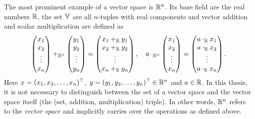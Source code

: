 The most prominent example of a vector space is \( \mathbb{R}^n \).
Its base field are the real numbers \( \mathbb{R} \), the set \( \mathbb{V} \) are all \( n \)-tuples with real components and vector addition and scalar multiplication are defined as
\begin{equation}
	\begin{pmatrix}
		x_{\num{1}} \\ x_{\num{2}} \\ \vdots \\ x_n
		\end{pmatrix} +_{\mathbb{R}^n} \begin{pmatrix}
		y_{\num{1}} \\ y_{\num{2}} \\ \vdots \\ y_n
	\end{pmatrix} = \begin{pmatrix}
	x_{\num{1}} +_{\mathbb{R}} y_{\num{1}} \\ x_{\num{2}} +_{\mathbb{R}} y_{\num{2}} \\ \vdots \\ x_n +_{\mathbb{R}} y_n
	\end{pmatrix},\quad a\cdot_{\mathbb{R}^n} \begin{pmatrix}
	x_{\num{1}} \\ x_{\num{2}} \\ \vdots \\ x_n
	\end{pmatrix} = \begin{pmatrix}
	a\cdot_{\mathbb{R}}x_{\num{1}} \\ a\cdot_{\mathbb{R}}x_{\num{2}} \\ \vdots \\ a\cdot_{\mathbb{R}}x_n
	\end{pmatrix}.
\end{equation}
Here \( x = (x_{\num{1}}, x_{\num{2}}, \dotsc, x_n)^\top \), \( y = (y_{\num{1}}, y_{\num{2}}, \dotsc, y_n)^\top \in \mathbb{R}^n \) and \( a \in \mathbb{R} \).
In this thesis, it is not necessary to distinguish between the set of a vector space and the vector space itself (the (set, addition, multiplication) triple).
In other words, \( \mathbb{R}^n \) refers to the \emph{vector space} and implicitly carries over the operations as defined above.

